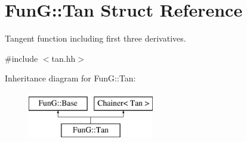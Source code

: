 \hypertarget{structFunG_1_1Tan}{\section{Fun\-G\-:\-:Tan Struct Reference}
\label{structFunG_1_1Tan}
}


Tangent function including first three derivatives.  




{\ttfamily \#include $<$tan.\-hh$>$}

Inheritance diagram for Fun\-G\-:\-:Tan\-:\begin{figure}[H]
\begin{center}
\leavevmode
\includegraphics[height=2.000000cm]{structFunG_1_1Tan}
\end{center}
\end{figure}
